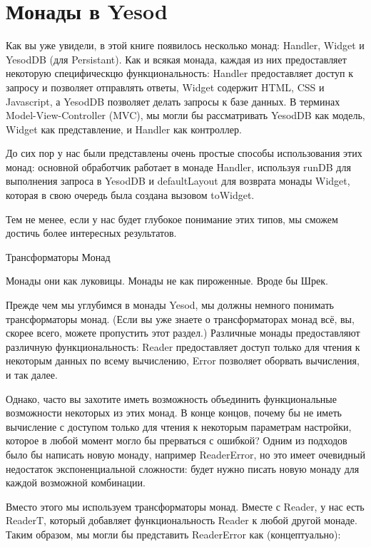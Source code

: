 \chapter{Монады в Yesod}\label{ch:yesod_monads}

Как вы уже увидели, в этой книге появилось несколько монад: Handler, Widget и YesodDB (для Persistant). Как и всякая монада, каждая из них предоставляет некоторую специфическцю функциональность: Handler предоставляет доступ к запросу и позволяет отправлять ответы, Widget содержит HTML, CSS и Javascript, а YesodDB позволяет делать запросы к базе данных. В терминах Model-View-Controller (MVC), мы могли бы рассматривать YesodDB как модель, Widget как представление, и Handler как контроллер.

До сих пор у нас были представлены очень простые способы использования этих монад: основной обработчик работает в монаде Handler, используя runDB для выполнения запроса в YesodDB и defaultLayout для возврата монады Widget, которая в свою очередь была создана вызовом toWidget.

Тем не менее, если у нас будет глубокое понимание этих типов, мы сможем достичь более интересных результатов.

Трансформаторы Монад

Монады они как луковицы. Монады не как пироженные. Вроде бы Шрек.

Прежде чем мы углубимся в монады Yesod, мы должны немного понимать трансформаторы монад. (Если вы уже знаете о трансформаторах монад всё, вы, скорее всего, можете пропустить этот раздел.) Различные монады предоставляют различную функциональность: Reader предоставляет доступ только для чтения к некоторым данных по всему вычислению, Error позволяет оборвать вычисления, и так далее.

Однако, часто вы захотите иметь возможность объединить функциональные возможности некоторых из этих монад. В конце концов, почему бы не иметь вычисление с доступом только для чтения к некоторым параметрам настройки, которое в любой момент могло бы прерваться с ошибкой? Одним из подходов было бы написать новую монаду, например ReaderError, но это имеет очевидный недостаток экспоненциальной сложности: будет нужно писать новую монаду для каждой возможной комбинации.

Вместо этого мы используем трансформаторы монад. Вместе с Reader, у нас есть ReaderT, который добавляет функциональность Reader к любой другой монаде. Таким образом, мы могли бы представить ReaderError как (концептуально):

